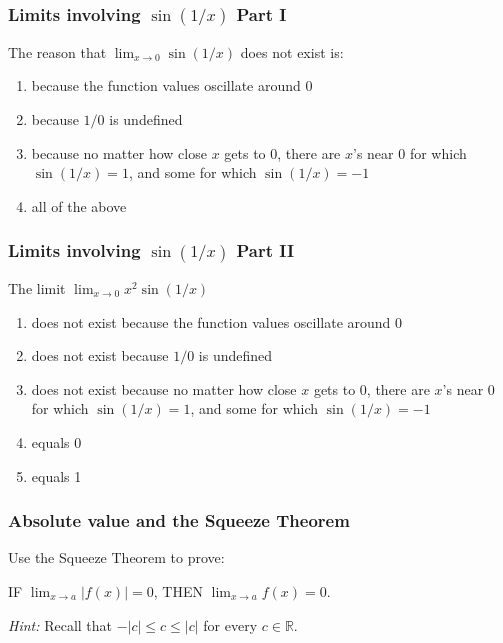 \begin{frame}
	\frametitle{Limits involving $\displaystyle \sin(1/x)$ Part I}

	\begin{block}{ The reason that $\displaystyle{\lim_{x\rightarrow 0}\sin (1/x)}$
	does not exist is:}
		\begin{enumerate}
			\item because the function values oscillate around $0$

			\item because $1/0$ is undefined

			\item because no matter how close $x$ gets to $0$, there are $x$'s near
				$0$ for which $\sin(1/x) =1$, and some for which $\sin (1/x)=-1$

			\item all of the above
		\end{enumerate}
	\end{block}
\end{frame}

\begin{frame}
	\frametitle{Limits involving $\displaystyle \sin(1/x)$ Part II}

	\begin{block}{The limit $\displaystyle{\lim_{x\rightarrow 0}x^2\sin (1/x)}$ }
		\begin{enumerate}
			\item does not exist because the function values oscillate around $0$

			\item does not exist because $1/0$ is undefined

			\item does not exist because no matter how close $x$ gets to $0$, there
				are $x$'s near $0$ for which $\sin(1/x) =1$, and some for which $\sin (1/
				x)=-1$

			\item equals 0

			\item equals 1
		\end{enumerate}
	\end{block}
\end{frame}

\begin{frame}
	\frametitle{Absolute value and the Squeeze Theorem}

	Use the Squeeze Theorem to prove:
	\begin{theorem}
		IF $\displaystyle \lim_{x\to a}|f(x)| = 0$, THEN
		$\displaystyle \lim_{x\to a}f(x)=0$.\\
	\end{theorem}

	\emph{Hint:} Recall that $-|c| \leq c \leq |c|$ for every $c \in \mathbb{R}$.
\end{frame}

